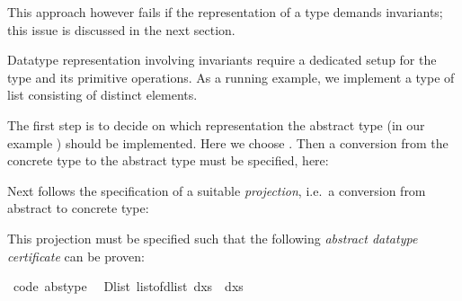 \begin{isabellebody}
\begin{isamarkuptext}
  This approach however fails if the representation of a type demands
  invariants; this issue is discussed in the next section.%
\end{isamarkuptext}%
\isamarkuptrue%
%
\isamarkuptrue%
%
\begin{isamarkuptext}%
Datatype representation involving invariants require a dedicated
  setup for the type and its primitive operations.  As a running
  example, we implement a type  of list consisting
  of distinct elements.

  The first step is to decide on which representation the abstract
  type (in our example ) should be implemented.
  Here we choose .  Then a conversion from the concrete
  type to the abstract type must be specified, here:%
\end{isamarkuptext}%
\isamarkuptrue%
%
\isadelimquote
%
\endisadelimquote
%
\isatagquote
%
\begin{isamarkuptext}%
%
\end{isamarkuptext}%
\isamarkuptrue%
%
\endisatagquote
{\isafoldquote}%
%
\isadelimquote
%
\endisadelimquote
%
\begin{isamarkuptext}%
\noindent Next follows the specification of a suitable \emph{projection},
  i.e.~a conversion from abstract to concrete type:%
\end{isamarkuptext}%
\isamarkuptrue%
%
\isadelimquote
%
\endisadelimquote
%
\isatagquote
%
\begin{isamarkuptext}%
%
\end{isamarkuptext}%
\isamarkuptrue%
%
\endisatagquote
{\isafoldquote}%
%
\isadelimquote
%
\endisadelimquote
%
\begin{isamarkuptext}%
\noindent This projection must be specified such that the following
  \emph{abstract datatype certificate} can be proven:%
\end{isamarkuptext}%
\isamarkuptrue%
%
\isadelimquote
%
\endisadelimquote
%
\isatagquote
{}\isamarkupfalse%
\ {\isacharbrackleft}code\ abstype{\isacharbrackright}{\isacharcolon}\isanewline
\ \ {\isachardoublequoteopen}Dlist\ {\isacharparenleft}list{\isacharunderscore}of{\isacharunderscore}dlist\ dxs{\isacharparenright}\ {\isacharequal}\ dxs{\isachardoublequoteclose}\isanewline

\end{isabellebody}
